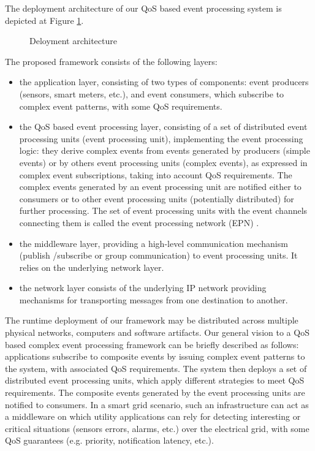 \documentclass[a4paper,twoside]{article}
\begin{document}
The deployment architecture of our QoS based event processing system is depicted at Figure \ref{fig:architecture}.
\begin{figure}[!h]
  \centering
   {}
  \caption{Deloyment architecture}
  \label{fig:architecture}
 \end{figure}
 The proposed framework consists of the following layers:
\begin{itemize}
\item the application layer, consisting of two types of components: event producers (sensors, smart meters, etc.), and event consumers, which subscribe to complex event patterns, with some QoS requirements.
\item the QoS based event processing layer, consisting of a set of distributed event processing units (event processing unit), implementing the event processing logic: they derive complex events from events generated by producers (simple events) or by others event processing units (complex events), as expressed in complex event subscriptions, taking into account QoS requirements. The complex events generated by an event processing unit are notified either to consumers or to other event processing units (potentially distributed) for further processing. The set of event processing units with the event channels connecting them is called the event processing network (EPN) \cite{Luckham2011}.
\item the middleware layer, providing a high-level communication mechanism (publish /subscribe or group communication) to event processing units. It relies on the underlying network layer.
\item the network layer consists of the underlying IP network providing mechanisms for transporting messages from one destination to another.  
\end{itemize}
The runtime deployment of our framework may be distributed across multiple physical networks, computers and software artifacts.
Our general vision to a QoS based complex event processing framework can be briefly described as follows: applications subscribe to composite events by issuing complex event patterns to the system, with associated QoS requirements. The system then deploys a set of distributed event processing units, which apply different strategies to meet QoS requirements. The composite events generated by the event processing units are notified to consumers. In a smart grid scenario, such an infrastructure can act as a middleware on which utility applications can rely for detecting interesting or critical situations (sensors errors, alarms, etc.) over the electrical grid, with some QoS guarantees (e.g. priority, notification latency, etc.).
\end{document}
